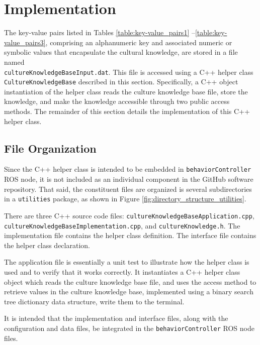 \documentclass{CSSRforAfrica}
\begin{document}
\newpage
\section{Implementation}
\label{section:implementation}

The key-value pairs listed in Tables \ref{table:key-value_pairs1} --\ref{table:key-value_pairs3}, comprising an alphanumeric key and associated  numeric or symbolic values that encapsulate the cultural knowledge, are stored in a file named\\ {\tt \small cultureKnowledgeBaseInput.dat}.  This file is accessed using a C++ helper class \\{\tt \small CultureKnowledgeBase} described in this section.  Specifically, a C++ object instantiation of  the helper class  reads the culture knowledge base file, store the knowledge, and make the knowledge accessible through two public access methods. The remainder of this section details the implementation of this C++ helper class.
 

\subsection{File Organization}
Since the C++ helper class is intended to be embedded in {\small \tt behaviorController} ROS node, it is not included as an individual component in the GitHub software repository.
That said, the constituent files are organized is several subdirectories in a {\small \tt utilities} package, as shown in Figure \ref{fig:directory_structure_utilities}. 

There are three C++ source code files:
{\small \tt cultureKnowledgeBaseApplication.cpp}, \\
{\small \tt cultureKnowledgeBaseImplementation.cpp}, and 
{\small \tt cultureKnowledge.h}.  The implementation file contains the helper class definition. The interface file contains the helper class declaration. 

The application file is essentially a unit test to illustrate how the helper class is used and to verify that it works correctly. It instantiates a C++ helper class object which reads the culture knowledge base file, and uses the access method to retrieve  values in  the  culture knowledge base, implemented using a binary search tree dictionary data structure, write them to the terminal.

It is intended that the implementation and interface files, along with the configuration and data files, be integrated in the {\small \tt behaviorController} ROS node files.  
\end{document}
